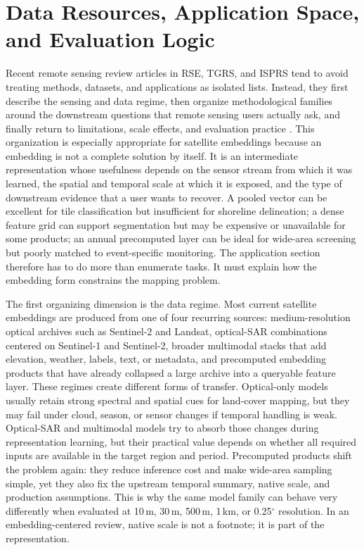 \section{Data Resources, Application Space, and Evaluation Logic}

Recent remote sensing review articles in RSE, TGRS, and ISPRS tend to avoid treating methods, datasets, and applications as isolated lists. Instead, they first describe the sensing and data regime, then organize methodological families around the downstream questions that remote sensing users actually ask, and finally return to limitations, scale effects, and evaluation practice \citep{ma2019dl_meta_isprs,yuan2020env_dl_rse,weiss2020agri_meta_rse,paoletti2019hsi_review,li2020object_detection_isprs,survey1,xiao2025foundation_survey}. This organization is especially appropriate for satellite embeddings because an embedding is not a complete solution by itself. It is an intermediate representation whose usefulness depends on the sensor stream from which it was learned, the spatial and temporal scale at which it is exposed, and the type of downstream evidence that a user wants to recover. A pooled vector can be excellent for tile classification but insufficient for shoreline delineation; a dense feature grid can support segmentation but may be expensive or unavailable for some products; an annual precomputed layer can be ideal for wide-area screening but poorly matched to event-specific monitoring. The application section therefore has to do more than enumerate tasks. It must explain how the embedding form constrains the mapping problem.

The first organizing dimension is the data regime. Most current satellite embeddings are produced from one of four recurring sources: medium-resolution optical archives such as Sentinel-2 and Landsat, optical-SAR combinations centered on Sentinel-1 and Sentinel-2, broader multimodal stacks that add elevation, weather, labels, text, or metadata, and precomputed embedding products that have already collapsed a large archive into a queryable feature layer. These regimes create different forms of transfer. Optical-only models usually retain strong spectral and spatial cues for land-cover mapping, but they may fail under cloud, season, or sensor changes if temporal handling is weak. Optical-SAR and multimodal models try to absorb those changes during representation learning, but their practical value depends on whether all required inputs are available in the target region and period. Precomputed products shift the problem again: they reduce inference cost and make wide-area sampling simple, yet they also fix the upstream temporal summary, native scale, and production assumptions. This is why the same model family can behave very differently when evaluated at 10\,m, 30\,m, 500\,m, 1\,km, or 0.25$^\circ$ resolution. In an embedding-centered review, native scale is not a footnote; it is part of the representation.

